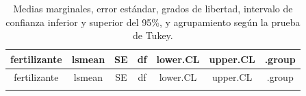 \documentclass[]{book}
\theoremstyle{definition}
\theoremstyle{definition}
\theoremstyle{definition}
\theoremstyle{remark}
\begin{document}
\begin{longtable}[]{@{}ccccccc@{}}
\caption{\label{tab:anova-fert} Medias marginales, error estándar, grados de
libertad, intervalo de confianza inferior y superior del 95\%, y
agrupamiento según la prueba de Tukey.}\tabularnewline
\toprule
\begin{minipage}[b]{0.19\columnwidth}\centering
fertilizante\strut
\end{minipage} & \begin{minipage}[b]{0.10\columnwidth}\centering
lsmean\strut
\end{minipage} & \begin{minipage}[b]{0.10\columnwidth}\centering
SE\strut
\end{minipage} & \begin{minipage}[b]{0.06\columnwidth}\centering
df\strut
\end{minipage} & \begin{minipage}[b]{0.12\columnwidth}\centering
lower.CL\strut
\end{minipage} & \begin{minipage}[b]{0.12\columnwidth}\centering
upper.CL\strut
\end{minipage} & \begin{minipage}[b]{0.09\columnwidth}\centering
.group\strut
\end{minipage}\tabularnewline
\midrule
\endfirsthead
\toprule
\begin{minipage}[b]{0.19\columnwidth}\centering
fertilizante\strut
\end{minipage} & \begin{minipage}[b]{0.10\columnwidth}\centering
lsmean\strut
\end{minipage} & \begin{minipage}[b]{0.10\columnwidth}\centering
SE\strut
\end{minipage} & \begin{minipage}[b]{0.06\columnwidth}\centering
df\strut
\end{minipage} & \begin{minipage}[b]{0.12\columnwidth}\centering
lower.CL\strut
\end{minipage} & \begin{minipage}[b]{0.12\columnwidth}\centering
upper.CL\strut
\end{minipage} & \begin{minipage}[b]{0.09\columnwidth}\centering
.group\strut
\end{minipage}\tabularnewline
\midrule
\endhead
\begin{minipage}[t]{0.19\columnwidth}\centering

\end{minipage}
\end{longtable}
\end{document}
